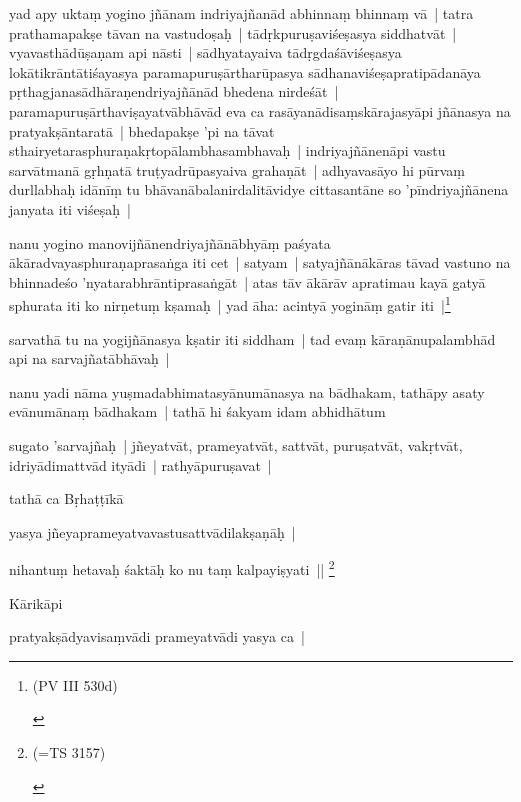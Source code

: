 \documentclass[article,a4paper]{memoir}
\begin{document}
	  \pstart yad apy uktaṃ yogino jñā\-nam indriyajñanā\-d abhinnaṃ bhinnaṃ vā\- | tatra prathamapakṣe tā\-van na vastudoṣaḥ | tā\-dṛkpuruṣaviśeṣasya siddhatvā\-t | vyavasthā\-dū\-ṣaṇam api nā\-sti | sā\-dhyatayaiva tā\-dṛgdaśā\-viśeṣasya lokā\-tikrā\-ntā\-tiśayasya paramapuruṣā\-rtharū\-pasya sā\-dhanaviśeṣapratipā\-danā\-ya pṛthagjanasā\-dhā\-raṇendriyajñā\-nā\-d bhedena nirdeśā\-t | paramapuruṣā\-rthaviṣayatvā\-bhā\-vā\-d eva ca rasā\-yanā\-disaṃskā\-rajasyā\-pi jñā\-nasya na pratyakṣā\-ntaratā\- | bhedapakṣe 'pi na tā\-vat sthairyetarasphuraṇakṛtopā\-lambhasambhavaḥ | indriyajñā\-nenā\-pi vastu sarvā\-tmanā\- gṛhṇatā\- truṭyadrū\-pasyaiva grahaṇā\-t | adhyavasā\-yo hi pū\-rvaṃ durllabhaḥ idā\-nī\-ṃ tu bhā\-vanā\-balanirdalitā\-vidye cittasantā\-ne so 'pī\-ndriyajñā\-nena janyata iti viśeṣaḥ | 
	\pend
      

	  \pstart nanu yogino manovijñā\-nendriyajñā\-nā\-bhyā\-ṃ paśyata ā\-kā\-radvayasphuraṇaprasaṅga iti cet | satyam | satyajñā\-nā\-kā\-ras tā\-vad vastuno na bhinnadeśo 'nyatarabhrā\-ntiprasaṅgā\-t | atas tā\-v ā\-kā\-rā\-v apratimau kayā\- gatyā\- sphurata iti ko nirṇetuṃ kṣamaḥ | yad ā\-ha: acintyā\- yoginā\-ṃ gatir iti |\footnote{\begin{english}(PV III 530d)\end{english}}
	\pend
      

	  \pstart sarvathā\- tu na yogijñā\-nasya kṣatir iti siddham | tad evaṃ kā\-raṇā\-nupalambhā\-d api na sarvajñatā\-bhā\-vaḥ | 
	\pend
      

	  \pstart nanu yadi nā\-ma yuṣmadabhimatasyā\-numā\-nasya na bā\-dhakam, tathā\-py asaty evā\-numā\-naṃ bā\-dhakam | tathā\- hi śakyam idam abhidhā\-tum 
	\pend
      

	  \pstart sugato 'sarvajñaḥ | jñeyatvā\-t, prameyatvā\-t, sattvā\-t, puruṣatvā\-t, vakṛtvā\-t, idriyā\-dimattvā\-d ityā\-di | rathyā\-puruṣavat | 
	\pend
      

	  \pstart tathā\- ca Bṛhaṭṭī\-kā\- 
	\pend
      

	  \pstart yasya jñeyaprameyatvavastusattvā\-dilakṣaṇā\-ḥ | 
	\pend
      

	  \pstart nihantuṃ hetavaḥ śaktā\-ḥ ko nu taṃ kalpayiṣyati || \footnote{\begin{english}(=TS 3157)\end{english}}
	\pend
      

	  \pstart Kā\-rikā\-pi 
	\pend
      

	  \pstart pratyakṣā\-dyavisaṃvā\-di prameyatvā\-di yasya ca | 
	\pend
      
\end{document}
